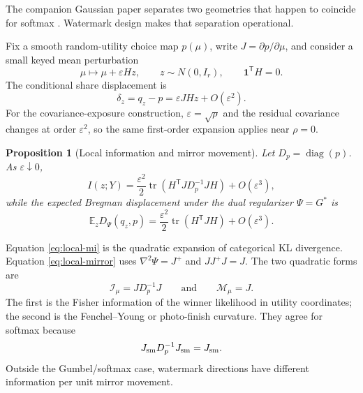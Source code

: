 \documentclass[11pt]{article}
\newtheorem{proposition}[theorem]{Proposition}
\theoremstyle{definition}
\theoremstyle{remark}
\DeclareMathOperator{\diag}{diag}
\DeclareMathOperator{\tr}{tr}
\newcommand{\E}{\mathbb{E}}
\newcommand{\one}{\mathbf{1}}
\newcommand{\Dp}{D_p}
\newcommand{\trans}{\mathsf{T}}
\begin{document}
The companion Gaussian paper separates two geometries that happen to coincide for softmax \citep{cotton2026gaussian}. Watermark design makes that separation operational.

Fix a smooth random-utility choice map $p(\mu)$, write $J=\partial p/\partial\mu$, and consider a small keyed mean perturbation
\begin{equation}
\mu\mapsto\mu+\varepsilon Hz,
\qquad z\sim N(0,I_r),
\qquad \one^\trans H=0.
\label{eq:small-keyed-mean}
\end{equation}
The conditional share displacement is
\begin{equation}
\delta_z=q_z-p=\varepsilon JHz+O(\varepsilon^2).
\label{eq:linearized-share}
\end{equation}
For the covariance-exposure construction, $\varepsilon=\sqrt{\rho}$ and the residual covariance changes at order $\varepsilon^2$, so the same first-order expansion applies near $\rho=0$.

\begin{proposition}[Local information and mirror movement]
\label{prop:local-info}
Let $\Dp=\diag(p)$. As $\varepsilon\downarrow0$,
\begin{equation}
I(z;Y)
=\frac{\varepsilon^2}{2}
\tr\!\left(H^\trans J\Dp^{-1}JH\right)
+O(\varepsilon^3),
\label{eq:local-mi}
\end{equation}
while the expected Bregman displacement under the dual regularizer $\Psi=G^*$ is
\begin{equation}
\E_z D_\Psi(q_z,p)
=\frac{\varepsilon^2}{2}
\tr\!\left(H^\trans JH\right)
+O(\varepsilon^3).
\label{eq:local-mirror}
\end{equation}
\end{proposition}

Equation \eqref{eq:local-mi} is the quadratic expansion of categorical KL divergence. Equation \eqref{eq:local-mirror} uses $\nabla^2\Psi=J^+$ and $JJ^+J=J$. The two quadratic forms are
\begin{equation}
\mathcal I_\mu=J\Dp^{-1}J
\qquad\text{and}\qquad
\mathcal M_\mu=J.
\label{eq:two-geometries}
\end{equation}
The first is the Fisher information of the winner likelihood in utility coordinates; the second is the Fenchel--Young or photo-finish curvature. They agree for softmax because
\begin{equation}
J_{\rm sm}\Dp^{-1}J_{\rm sm}=J_{\rm sm}.
\label{eq:softmax-coincidence}
\end{equation}
Outside the Gumbel/softmax case, watermark directions have different information per unit mirror movement.
\end{document}
